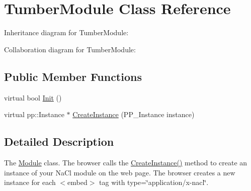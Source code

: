 \hypertarget{class_tumber_module}{\section{Tumber\+Module Class Reference}
\label{class_tumber_module}
}


Inheritance diagram for Tumber\+Module\+:


Collaboration diagram for Tumber\+Module\+:
\subsection*{Public Member Functions}
\begin{DoxyCompactItemize}
\item 
virtual bool \hyperlink{class_tumber_module_a535c64fc635b897bc75c03a8f5f9405f}{Init} ()
\item 
virtual pp\+::\+Instance $\ast$ \hyperlink{class_tumber_module_ad2c9f82563eebdc1b838f9f30c165734}{Create\+Instance} (P\+P\+\_\+\+Instance instance)
\end{DoxyCompactItemize}


\subsection{Detailed Description}
The \hyperlink{struct_module}{Module} class. The browser calls the \hyperlink{class_tumber_module_ad2c9f82563eebdc1b838f9f30c165734}{Create\+Instance()} method to create an instance of your Na\+Cl module on the web page. The browser creates a new instance for each $<$embed$>$ tag with type=\char`\"{}application/x-\/nacl\char`\"{}. 

